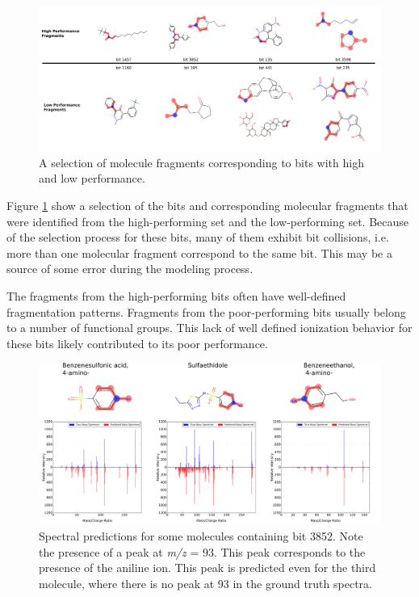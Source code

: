\begin{figure}[h]
    \centering
    \includegraphics[width=0.9\linewidth]{good_bad_molecules_horiz.png}
        \caption[Sample Selection of Fingerprint Bits with High and Low Predictive Accuracy]{A selection of molecule fragments corresponding to bits with high and low performance.}
    \label{fig:good_bad_bit_figures}
\end{figure}

Figure \ref{fig:good_bad_bit_figures} show a selection of the bits and corresponding molecular fragments that were identified from the high-performing set and the low-performing set. Because of the selection process for these bits, many of them exhibit bit collisions, i.e. more than one molecular fragment correspond to the same bit. This may be a source of some error during the modeling process.

The fragments from the high-performing bits often have well-defined fragmentation patterns. Fragments from the poor-performing bits usually belong to a number of functional groups. This lack of well defined ionization behavior for these bits likely contributed to its poor performance.

\begin{figure}[h]
    \centering
    \includegraphics[width=0.95\linewidth]{bit_3852_highlight_spectra_2.png}
        \caption[Spectral Prediction Examples for bit 3852]{Spectral predictions for some molecules containing bit 3852. Note the presence of a peak at \textit{m/z} = 93. This peak corresponds to the presence of the aniline ion. This peak is predicted even for the third molecule, where there is no peak at 93 in the ground truth spectra.}
    \label{fig:bit_example_spectra}
\end{figure}

